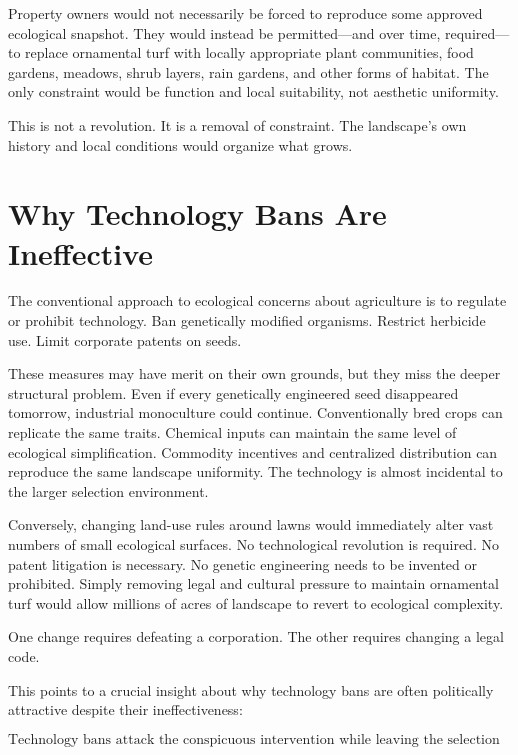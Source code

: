 \documentclass[12pt]{article}
\begin{document}
Property owners would not necessarily be forced to reproduce some approved ecological snapshot. They would instead be permitted---and over time, required---to replace ornamental turf with locally appropriate plant communities, food gardens, meadows, shrub layers, rain gardens, and other forms of habitat. The only constraint would be function and local suitability, not aesthetic uniformity.

This is not a revolution. It is a removal of constraint. The landscape's own history and local conditions would organize what grows.

\section{Why Technology Bans Are Ineffective}

The conventional approach to ecological concerns about agriculture is to regulate or prohibit technology. Ban genetically modified organisms. Restrict herbicide use. Limit corporate patents on seeds.

These measures may have merit on their own grounds, but they miss the deeper structural problem. Even if every genetically engineered seed disappeared tomorrow, industrial monoculture could continue. Conventionally bred crops can replicate the same traits. Chemical inputs can maintain the same level of ecological simplification. Commodity incentives and centralized distribution can reproduce the same landscape uniformity. The technology is almost incidental to the larger selection environment.

Conversely, changing land-use rules around lawns would immediately alter vast numbers of small ecological surfaces. No technological revolution is required. No patent litigation is necessary. No genetic engineering needs to be invented or prohibited. Simply removing legal and cultural pressure to maintain ornamental turf would allow millions of acres of landscape to revert to ecological complexity.

One change requires defeating a corporation. The other requires changing a legal code.

This points to a crucial insight about why technology bans are often politically attractive despite their ineffectiveness:

\begin{equation}
\boxed{\text{Technology bans attack the conspicuous intervention while leaving the selection environment intact.}}
\end{equation}
\end{document}
